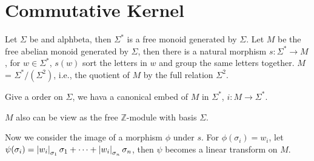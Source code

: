 \section{Commutative Kernel}
Let $\Sigma$ be and alphbeta, then $\Sigma^\ast$ is a free monoid generated by $\Sigma$.
Let $M$ be the free abelian monoid generated by $\Sigma$, then there is a natural morphism 
$s : \Sigma^\ast \to M$, for $w \in \Sigma^\ast$, $s(w)$ sort the letters in $w$ and group 
the same letters together. $M$ = $\Sigma^\ast / (\Sigma^2)$, i.e., the quotient of $M$ by
the full relation $\Sigma^2$. 

Give a order on $\Sigma$, we hava a canonical embed of $M$ in $\Sigma^\ast$, $i : M \to \Sigma^\ast$. 


$M$ also can be view as the free $\mathbb Z$-module with basis $\Sigma$.

Now we consider the image of a morphism $\phi$ under $s$. 
For $\phi(\sigma_i) = w_i$, let $\psi(\sigma_i) = \left| {w_i} \right|_{\sigma_1}\sigma_1 + \cdots + \left| {w_i} \right|_{\sigma_n} \sigma_n$,
then $\psi$ becomes a linear transform on $M$.
